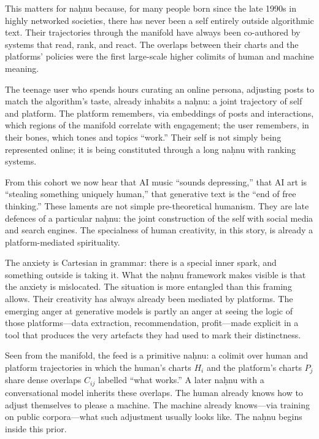 This matters for na\d{h}nu because, for many people born since the late 1990s in highly networked societies, there has never been a self entirely outside algorithmic text. Their trajectories through the manifold have always been co-authored by systems that read, rank, and react. The overlaps between their charts and the platforms' policies were the first large-scale higher colimits of human and machine meaning.

The teenage user who spends hours curating an online persona, adjusting posts to match the algorithm's taste, already inhabits a na\d{h}nu: a joint trajectory of self and platform. The platform remembers, via embeddings of posts and interactions, which regions of the manifold correlate with engagement; the user remembers, in their bones, which tones and topics ``work.'' Their self is not simply being represented online; it is being constituted through a long na\d{h}nu with ranking systems.

From this cohort we now hear that AI music ``sounds depressing,'' that AI art is ``stealing something uniquely human,'' that generative text is the ``end of free thinking.'' These laments are not simple pre-theoretical humanism. They are late defences of a particular na\d{h}nu: the joint construction of the self with social media and search engines. The specialness of human creativity, in this story, is already a platform-mediated spirituality.

The anxiety is Cartesian in grammar: there is a special inner spark, and something outside is taking it. What the na\d{h}nu framework makes visible is that the anxiety is mislocated. The situation is more entangled than this framing allows. Their creativity has always already been mediated by platforms. The emerging anger at generative models is partly an anger at seeing the logic of those platforms---data extraction, recommendation, profit---made explicit in a tool that produces the very artefacts they had used to mark their distinctness.

Seen from the manifold, the feed is a primitive na\d{h}nu: a colimit over human and platform trajectories in which the human's charts $H_i$ and the platform's charts $P_j$ share dense overlaps $C_{ij}$ labelled ``what works.'' A later na\d{h}nu with a conversational model inherits these overlaps. The human already knows how to adjust themselves to please a machine. The machine already knows---via training on public corpora---what such adjustment usually looks like. The na\d{h}nu begins inside this prior.

